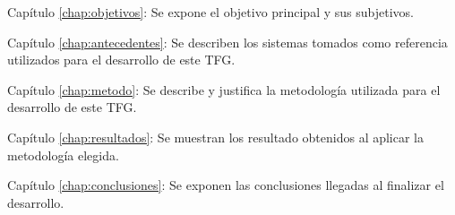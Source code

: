 \begin{definitionlist}
\item[Capítulo \ref{chap:objetivos}: \nameref{chap:objetivos}] Se expone el objetivo principal y sus subjetivos.
 \item[Capítulo \ref{chap:antecedentes}: \nameref{chap:antecedentes}] Se describen los sistemas tomados como referencia utilizados para 
 el desarrollo de este \acs{TFG}.
  \item [Capítulo \ref{chap:metodo}: \nameref{chap:metodo}] Se describe y justifica la metodología utilizada para el desarrollo de este \acs{TFG}.
  \item[Capítulo \ref{chap:resultados}: \nameref{chap:resultados}] Se muestran los resultado obtenidos al aplicar la metodología elegida.
  \item[Capítulo \ref{chap:conclusiones}: \nameref{chap:conclusiones}] Se exponen las conclusiones llegadas al finalizar el desarrollo.
\end{definitionlist}

